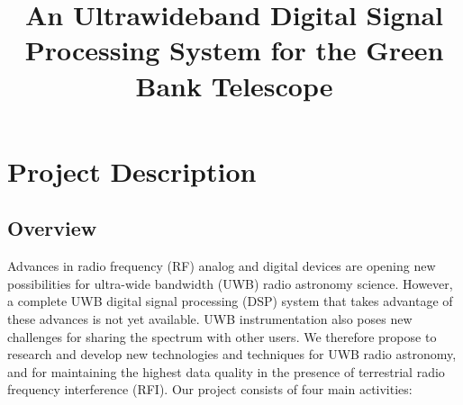 \documentclass[10pt]{myNSF}
\begin{document}
\title{An Ultrawideband Digital Signal Processing System for the Green
  Bank Telescope}
\maketitle

\section{Project Description}
\label{sec:project_description}

\subsection{Overview}
\label{sec:overview}

Advances in radio frequency (RF) analog and digital devices are
opening new possibilities for ultra-wide bandwidth (UWB) radio
astronomy science.  However, a complete UWB digital signal processing
(DSP) system that takes advantage of these advances is not yet
available.  UWB instrumentation also poses new challenges for sharing
the spectrum with other users.  We therefore propose to research and
develop new technologies and techniques for UWB radio astronomy, and
for maintaining the highest data quality in the presence of
terrestrial radio frequency interference (RFI).  Our project consists
of four main activities:
\end{document}
